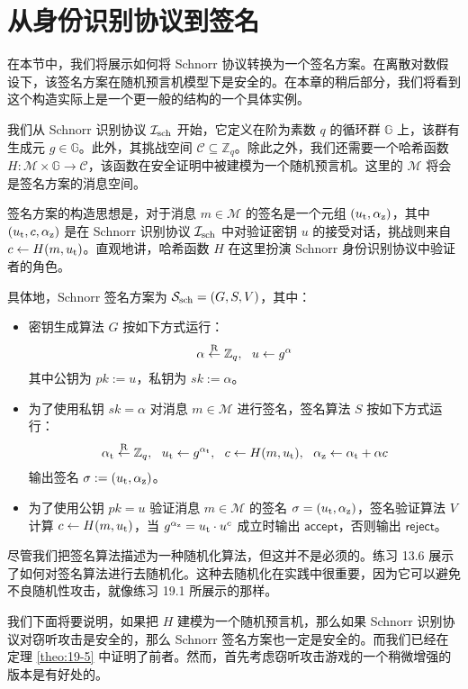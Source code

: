 \section{从身份识别协议到签名}\label{sec:19-2}

在本节中，我们将展示如何将 Schnorr 协议转换为一个签名方案。在离散对数假设下，该签名方案在随机预言机模型下是安全的。在本章的稍后部分，我们将看到这个构造实际上是一个更一般的结构的一个具体实例。

我们从 Schnorr 识别协议 $\mathcal{I}_{\rm sch}$ 开始，它定义在阶为素数 $q$ 的循环群 $\mathbb{G}$ 上，该群有生成元 $g\in\mathbb{G}$。此外，其挑战空间 $\mathcal{C}\subseteq\mathbb{Z}_q$。除此之外，我们还需要一个哈希函数 $H:\mathcal{M}\times\mathbb{G}\to\mathcal{C}$，该函数在安全证明中被建模为一个随机预言机。这里的 $\mathcal{M}$ 将会是签名方案的消息空间。

签名方案的构造思想是，对于消息 $m\in\mathcal{M}$ 的签名是一个元组 $(u_{\rm t},\alpha_{\rm z})$，其中 $(u_{\rm t},c,\alpha_{\rm z})$ 是在 Schnorr 识别协议 $\mathcal{I}_{\rm sch}$ 中对验证密钥 $u$ 的接受对话，挑战则来自 $c\leftarrow H(m,u_{\rm t})$。直观地讲，哈希函数 $H$ 在这里扮演 Schnorr 身份识别协议中验证者的角色。

具体地，Schnorr 签名方案为 $\mathcal{S}_{\rm sch}=(G,S,V)$，其中：
\begin{itemize}
	\item 密钥生成算法 $G$ 按如下方式运行：
	    $$\alpha\overset{\rm R}\leftarrow\mathbb{Z}_q, ~~u\leftarrow g^\alpha$$
	    其中公钥为 $pk:=u$，私钥为 $sk:=\alpha$。
	\item 为了使用私钥 $sk=\alpha$ 对消息 $m\in\mathcal{M}$ 进行签名，签名算法 $S$ 按如下方式运行：
		$$\alpha_{\rm t}\overset{\rm R}\leftarrow\mathbb{Z}_q,~~
			u_{\rm t}\leftarrow g^{\alpha_{\rm t}},~~
			c\leftarrow H(m,u_{\rm t}),~~
			\alpha_{\rm z}\leftarrow\alpha_{\rm t}+\alpha c$$
		输出签名 $\sigma:=(u_{\rm t},\alpha_{\rm z})$。
	\item 为了使用公钥 $pk=u$ 验证消息 $m\in\mathcal{M}$ 的签名 $\sigma=(u_{\rm t},\alpha_{\rm z})$，签名验证算法 $V$ 计算 $c\leftarrow H(m,u_{\rm t})$，当 $g^{\alpha_{\rm z}}=u_{\rm t}\cdot u^c$ 成立时输出 $\mathsf{accept}$，否则输出 $\mathsf{reject}$。
\end{itemize}

尽管我们把签名算法描述为一种随机化算法，但这并不是必须的。练习 13.6 展示了如何对签名算法进行去随机化。这种去随机化在实践中很重要，因为它可以避免不良随机性攻击，就像练习 19.1 所展示的那样。

我们下面将要说明，如果把 $H$ 建模为一个随机预言机，那么如果 Schnorr 识别协议对窃听攻击是安全的，那么 Schnorr 签名方案也一定是安全的。而我们已经在定理 \ref{theo:19-5} 中证明了前者。然而，首先考虑窃听攻击游戏的一个稍微增强的版本是有好处的。

